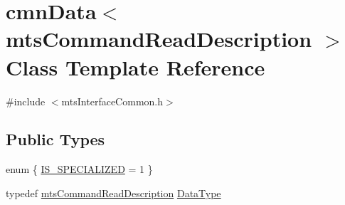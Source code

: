 \hypertarget{classcmn_data_3_01mts_command_read_description_01_4}{\section{cmn\-Data$<$ mts\-Command\-Read\-Description $>$ Class Template Reference}
\label{classcmn_data_3_01mts_command_read_description_01_4}
}


{\ttfamily \#include $<$mts\-Interface\-Common.\-h$>$}

\subsection*{Public Types}
\begin{DoxyCompactItemize}
\item 
enum \{ \hyperlink{classcmn_data_3_01mts_command_read_description_01_4_ae9cb28769cb3b1a010947c51bcc0d52ea6a40e73c19f5856a03ff689158203d6d}{I\-S\-\_\-\-S\-P\-E\-C\-I\-A\-L\-I\-Z\-E\-D} = 1
 \}
\item 
typedef \hyperlink{classmts_command_read_description}{mts\-Command\-Read\-Description} \hyperlink{classcmn_data_3_01mts_command_read_description_01_4_a1ecbaf4ae55d2af19547b13a35e88618}{Data\-Type}
\end{DoxyCompactItemize}
